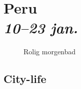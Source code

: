 \section*{Peru \\ {\footnotesize \textit{10--23 jan.}}}
\begin{figure}[!h]
	\centering
\noindent{}
	\caption{Rolig morgenbad}
\label{fig:coverphoto}
\end{figure}
\clearpage
\subsection*{City-life}



